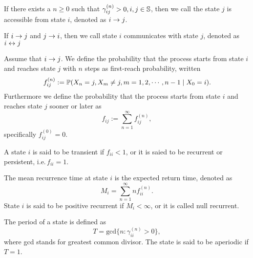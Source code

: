 		\begin{defn}
		\label{defn:markov:accessible}
		If there exists a $n \geq 0$ such that $\gamma_{ij}^{(n)} > 0,i,j \in {\mathbb S}$,
		then we call the state $j$ is accessible from state $i$,
		denoted as $i \rightarrow j$.

		If $i \rightarrow j$ and $j \rightarrow i$, 
		then we call state $i$ communicates with state $j$,
		denoted as $i \leftrightarrow j$
		\end{defn}

		\begin{defn}
		\label{defn:markov:firstprob}
		Assume that $i \rightarrow j$.
		We define the probability that the process starts from 
		state $i$ and reaches state $j$ with $n$ steps as first-reach probability, written
			\begin{equation}
			\label{eq:preliminary:markov:firstprob}
			f_{ij}^{(n)} := \mathbb{P}(X_n = j,X_m \neq j,m = 1,2,\cdots,n-1 \mid X_0 = i).
			\end{equation}
		Furthermore we define the probability that the process 
		starts from state $i$ and reaches state $j$ sooner or later as
			\begin{equation}
			\label{eq:preliminary:markov:soonerlaterprob}
			f_{ij} := \sum_{n=1}^{\infty} f_{ij}^{(n)},
			\end{equation}
		specifically $f_{ij}^{(0)} = 0$.
		\end{defn}

		\begin{defn}
		\label{defn:markov:transience}
		A state $i$ is said to be transient if $f_{ii} < 1$, 
		or it is saied to be recurrent or persistent, i.e.\,$f_{ii} = 1$.
		\end{defn}

		\begin{defn}
		\label{defn:markov:recurtime}
		The mean recurrence time at state $i$ is the expected return time, denoted as
			\begin{equation}
			\label{eq:preliminary:markov:recurtime}
			M_i = \sum_{n=1}^{\infty} nf_{ii}^{(n)}.
			\end{equation}
		State $i$ is said to be positive recurrent if $M_i < \infty$, 
		or it is called null recurrent.
		\end{defn}

		\begin{defn}
		\label{defn:markov:periodicity}
		The period of a state is defined as
			\begin{equation}
			\label{eq:preliminary:markov:period}
			T = \text{gcd}\{n \colon \gamma_{ii}^{(n)} > 0\},
			\end{equation}
		where gcd stands for greatest common divisor.
		The state is said to be aperiodic if $T = 1$.
		\end{defn}

